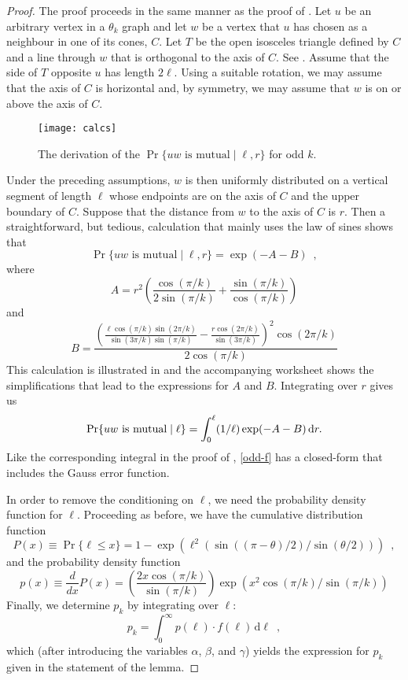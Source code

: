 \documentclass{patmorin}
\begin{document}
\begin{proof}
  The proof proceeds in the same manner as the proof of .
  Let $u$ be an arbitrary vertex in a $\theta_k$ graph and let $w$ be
  a vertex that $u$ has chosen as a neighbour in one of its cones, $C$.
  Let $T$ be the open isosceles triangle defined by $C$ and a line through
  $w$ that is orthogonal to the axis of $C$. See .
  Assume that the side of $T$ opposite $u$ has length $2\ell$.  Using a
  suitable rotation, we may assume that the axis of $C$ is horizontal and,
  by symmetry, we may assume that $w$ is on or above the axis of $C$.
 
  \begin{figure}
    \texttt{[image: calcs]}
    \caption{The derivation of the $\Pr\{\mbox{$uw$ is mutual}\mid \ell,r\}$
             for odd $k$.}
  \end{figure}
  Under the preceding assumptions, $w$ is then uniformly distributed on
  a vertical segment of length $\ell$ whose endpoints are on the axis
  of $C$ and the upper boundary of $C$.  Suppose that the distance from
  $w$ to the axis of $C$ is $r$.  Then a straightforward, but tedious,
  calculation that mainly uses the law of sines shows that
  \[
      \Pr\{\mbox{$uw$ is mutual}\mid \ell, r\} = \exp(-A-B) \enspace ,
  \]
  where
  \[ 
      A = r^2\left(\frac{\cos(\pi/k)}{2\sin(\pi/k)}+\frac{\sin(\pi/k)}{\cos(\pi/k)}\right)
  \]
  and
  \[
      B = \frac{\left(\frac{\ell\cos(\pi/k)\sin(2\pi/k)}{\sin(3\pi/k)\sin(\pi/k)}-\frac{r\cos(2\pi/k)}{\sin(3\pi/k)}\right)^2\cos(2\pi/k)}{2\cos(\pi/k)}
  \]
  This calculation is illustrated in  and the
  accompanying worksheet shows the simplifications that lead to the
  expressions for $A$ and $B$.  Integrating over $r$ gives us
  \begin{equation}
    \Pr\{\mbox{$uw$ is mutual}\mid \ell\} = 
      \int_0^\ell (1/\ell)\exp(-A-B)\,\mathrm{d}r . \eqlabel{odd-f}
  \end{equation}
  Like the corresponding integral in the proof of ,
  \eqref{odd-f} has a closed-form that includes the Gauss error function.

  In order to remove the conditioning on $\ell$, we need the probability
  density function for $\ell$.  Proceeding as before, we have the
  cumulative distribution function
  \[
     P(x) \equiv \Pr\{\ell\le x\} 
          = 1 - \exp(\ell^2(\sin((\pi-\theta)/2)/\sin(\theta/2))) \enspace ,
  \]
  and the probability density function
  \[
    p(x)\equiv \frac{d}{dx}P(x) = 
     \left(\frac{2x\cos(\pi/k)}{\sin(\pi/k)}\right)
      \exp(x^2\cos(\pi/k)/\sin(\pi/k))
  \]
  Finally, we determine $p_k$ by integrating over $\ell$:
  \[
     p_k = \int_0^\infty p(\ell)\cdot f(\ell)\, \mathrm{d}{\ell} \enspace ,
  \]
  which (after introducing the variables $\alpha$, $\beta$, and $\gamma$)
  yields the expression for $p_k$ given in the statement of the lemma.
\end{proof}
\end{document}

